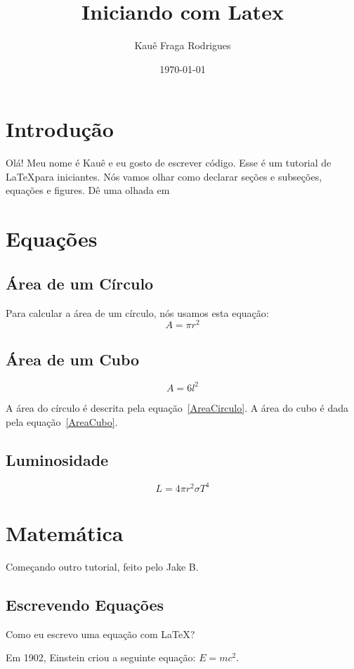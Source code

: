 \documentclass[a4paper, 12pt]{article}
\title{\vspace{-3.5cm}\huge{Iniciando com Latex}}
\author{\vspace{-3mm}Kauê Fraga Rodrigues}
\date{\vspace{-0.5cm}\today}
\begin{document}
\maketitle

\section{Introdução} %
Olá! Meu nome é Kauê e eu gosto de escrever código.
Esse é um tutorial de \LaTeX para iniciantes. Nós vamos olhar como declarar
seções e subseções, equações e figures. Dê uma olhada em \cite{alves2003introduccao}

\section{Equações}
\subsection{Área de um Círculo}
Para calcular a área de um círculo, nós usamos esta equação:
\begin{equation}\label{AreaCirculo}
  A = \pi r^2
\end{equation}

\subsection{Área de um Cubo}
\begin{equation}\label{AreaCubo}
  A = 6 l^2
\end{equation}

A área do círculo é descrita pela equação~\ref{AreaCirculo}.
A área do cubo é dada pela equação~\ref{AreaCubo}.

\subsection{Luminosidade}
\begin{equation}\label{Luminosidade}
  L = 4 \pi r^2 \sigma T^4
\end{equation}

\newpage

\section{Matemática}
Começando outro tutorial, feito pelo Jake B.

\subsection{Escrevendo Equações}
Como eu escrevo uma equação com \LaTeX? \par
Em 1902, Einstein criou a seguinte equação: $E = mc^2$.
\end{document}
